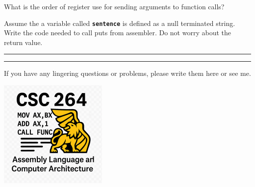 \documentclass[letterpaper,12pt]{exam}
\begin{document}
\begin{questions}
\begin{samepage}
    \question What is the order of register use for sending arguments to function calls?
    \vspace{5mm}
\end{samepage}
\par
\begin{samepage}
    \question Assume the a variable called \texttt{\textbf{sentence}} is defined as a null terminated string.  Write the code needed to call puts from assembler.  Do not worry about the return value.
    \vspace{35mm}
\end{samepage}
\par
 \par
  

\rule{0.5\textwidth}{.4pt} %






\end{questions} 
\begin{center}
    \rule{0.667\textwidth}{.8pt} %
\end{center}


If you have any lingering questions or problems, please write them here or see me.
\vfill
\begin{center}
\includegraphics{../csc264Logo}
\end{center}
\end{document}
